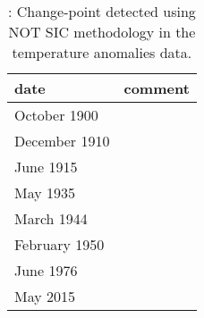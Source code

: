 \begin{table}[ht]
\centering
\begin{tabular}{ll}
  \hline
date & comment \\ 
  \hline
October 1900 &  \\ 
  December 1910 &  \\ 
  June 1915 &  \\ 
  May 1935 &  \\ 
  March 1944 &  \\ 
  February 1950 &  \\ 
  June 1976 &  \\ 
  May 2015 &  \\ 
   \hline
\end{tabular}
\caption{\label{Table:temp_anomalies_changepoints}: Change-point detected using NOT SIC methodology in the temperature anomalies data.} 
\end{table}
